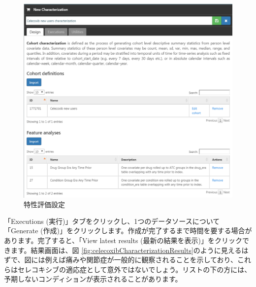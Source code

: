\documentclass[
  11pt]{book}
\theoremstyle{definition}
\theoremstyle{definition}
\theoremstyle{definition}
\theoremstyle{definition}
\theoremstyle{remark}
\begin{document}
\begin{figure}

{\centering \includegraphics[width=1\linewidth]{images/SuggestedAnswers/celecoxibCharacterization} 

}

\caption{特性評価設定}\label{fig:celecoxibCharacterization}
\end{figure}

「Executions (実行)」タブをクリックし、1つのデータソースについて「Generate (作成)」をクリックします。作成が完了するまで時間を要する場合があります。完了すると、「View latest results (最新の結果を表示)」をクリックできます。結果画面は、図 \ref{fig:celecoxibCharacterizationResults}のように見えるはずで、図には例えば痛みや関節症が一般的に観察されることを示しており、これらはセレコキシブの適応症として意外ではないでしょう。リストの下の方には、予期しないコンディションが表示されることがあります。
\end{document}

